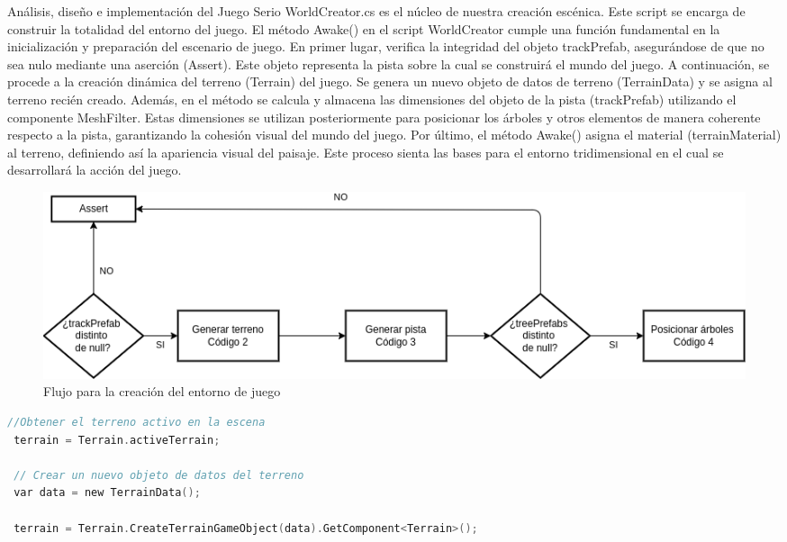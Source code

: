 \begin{thesischapter}{2} {Análisis, diseño e implementación del Juego Serio}
    \vspace{10pt}
    WorldCreator.cs es el núcleo de nuestra creación escénica. Este script se encarga de construir la totalidad del entorno del 
    juego. El método Awake() en el script WorldCreator cumple una función fundamental en la inicialización y preparación del escenario 
    de juego. En primer lugar, verifica la integridad del objeto trackPrefab, asegurándose de que no sea nulo mediante una aserción (Assert).
    Este objeto representa la pista sobre la cual se construirá el mundo del juego. A continuación, se procede a la creación dinámica del terreno 
    (Terrain) del juego. Se genera un nuevo objeto de datos de terreno (TerrainData) y se asigna al terreno recién creado. Además, en el método se 
    calcula y almacena las dimensiones del objeto de la pista (trackPrefab) utilizando el componente MeshFilter. Estas dimensiones 
    se utilizan posteriormente para posicionar los árboles y otros elementos de manera coherente respecto a la pista, garantizando la cohesión visual 
    del mundo del juego. Por último, el método Awake() asigna el material (terrainMaterial) al terreno, definiendo así la apariencia visual del paisaje.
    Este proceso sienta las bases para el entorno tridimensional en el cual se desarrollará la acción del juego.

    \begin{figure}[ht]
        \centering
        \includegraphics[scale=0.5]{images/generate-world.png}
        \caption{Flujo para la creación del entorno de juego}
        \label{fig: generate-world}
    \end{figure}

\begin{center}
\begin{minipage}{0.8\textwidth}
\begin{lstlisting}[language=c, caption={Generar terreno},label={hola}]
 //Obtener el terreno activo en la escena
 terrain = Terrain.activeTerrain;
 
 // Crear un nuevo objeto de datos del terreno
 var data = new TerrainData();

 terrain = Terrain.CreateTerrainGameObject(data).GetComponent<Terrain>();
 

\end{lstlisting}
\end{minipage}
\end{center}
\end{thesischapter}
